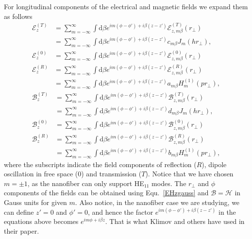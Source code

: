 For longitudinal components of the electrical and magnetic fields we expand them as follows
\begin{subequations}\label{ET0Rexpand}
\begin{align}
\mathcal{E}^{(T)}_z &= \sum_{m=-\infty}^\infty \int \mathrm{d}\beta e^{im(\phi-\phi') + i\beta (z-z')} \mathcal{E}^{(T)}_{z,m\beta}(r\!_\perp)\\
&= \sum_{m=-\infty}^\infty \int \mathrm{d}\beta e^{im(\phi-\phi') + i\beta (z-z')} c_{m\beta} J_m (hr\!_\perp),\\
\mathcal{E}^{(0)}_{z} &= \sum_{m=-\infty}^\infty \int \mathrm{d}\beta e^{im(\phi-\phi') + i\beta (z-z')} \mathcal{E}^{(0)}_{z,m\beta}(r\!_\perp)\\
\mathcal{E}^{(R)}_z &= \sum_{m=-\infty}^\infty \int \mathrm{d}\beta e^{im(\phi-\phi') + i\beta (z-z')} \mathcal{E}^{(R)}_{z,m\beta}(r\!_\perp)\\
&= \sum_{m=-\infty}^\infty \int \mathrm{d}\beta e^{im(\phi-\phi') + i\beta (z-z')} a_{m\beta} H_m^{(1)} (pr\!_\perp),
\end{align}
\end{subequations}
\begin{subequations}\label{BT0Rexpand}
\begin{align}
\mathcal{B}^{(T)}_z &= \sum_{m=-\infty}^\infty \int \mathrm{d}\beta e^{im(\phi-\phi') + i\beta (z-z')} \mathcal{B}^{(T)}_{z,m\beta}(r\!_\perp)\\
&= \sum_{m=-\infty}^\infty \int \mathrm{d}\beta e^{im(\phi-\phi') + i\beta (z-z')} d_{m\beta} J_m (hr\!_\perp),\\
\mathcal{B}^{(0)}_{z} &= \sum_{m=-\infty}^\infty \int \mathrm{d}\beta e^{im(\phi-\phi') + i\beta (z-z')} \mathcal{B}^{(0)}_{z,m\beta}(r\!_\perp)\\
\mathcal{B}^{(R)}_z &= \sum_{m=-\infty}^\infty \int \mathrm{d}\beta e^{im(\phi-\phi') + i\beta (z-z')} \mathcal{B}^{(R)}_{z,m\beta}(r\!_\perp)\\
&= \sum_{m=-\infty}^\infty \int \mathrm{d}\beta e^{im(\phi-\phi') + i\beta (z-z')} b_{m\beta} H_m^{(1)} (pr\!_\perp),
\end{align}
\end{subequations}
where the subscripts indicate the field components of reflection ($R$), dipole oscillation in free space ($0$) and transmission ($ T $). Notice that we have chosen $ m=\pm 1 $, as the nanofiber can only support HE$_{11}$ modes. 
The $ r\!_\perp $ and $ \phi $ components of the fields can be obtained using Equ.~\eqref{EHzgauss} and $ \mathcal{B}=\mathcal{H} $ in Gauss units for given $ m $. Also notice, in the nanofiber case we are studying, we can define $ z'=0 $ and $ \phi'=0 $, and hence the factor $ e^{im(\phi-\phi') + i\beta (z-z')} $ in the equations above becomes $ e^{im\phi + i\beta z} $. That is what Klimov and others have used in their paper.

